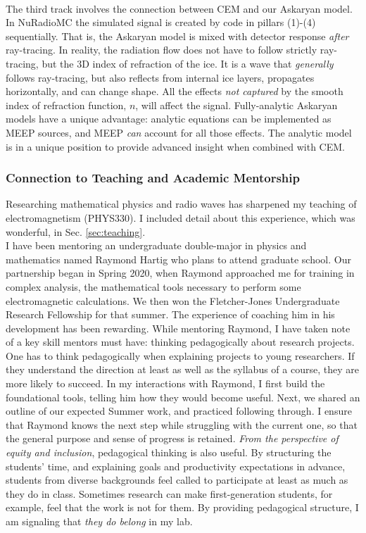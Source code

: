 \documentclass[../../../main.tex]{subfiles}
\begin{document}
\\
\vspace{0.15cm}
The third track involves the connection between CEM and our Askaryan model.  In NuRadioMC the simulated signal is created by code in pillars (1)-(4) sequentially.  That is, the Askaryan model is mixed with detector response \textit{after} ray-tracing.  In reality, the radiation flow does not have to follow strictly ray-tracing, but the 3D index of refraction of the ice.  It is a wave that \textit{generally} follows ray-tracing, but also reflects from internal ice layers, propagates horizontally, and can change shape.  All the effects \textit{not captured} by the smooth index of refraction function, $n$, will affect the signal.  Fully-analytic Askaryan models have a unique advantage: analytic equations can be implemented as MEEP sources, and MEEP \textit{can} account for all those effects.  The analytic model is in a unique position to provide advanced insight when combined with CEM.

\subsubsection{Connection to Teaching and Academic Mentorship}

Researching mathematical physics and radio waves has sharpened my teaching of electromagnetism (PHYS330).  I included detail about this experience, which was wonderful, in Sec. \ref{sec:teaching}.
\\
\vspace{0.15cm}
I have been mentoring an undergraduate double-major in physics and mathematics named Raymond Hartig who plans to attend graduate school.  Our partnership began in Spring 2020, when Raymond approached me for training in complex analysis, the mathematical tools necessary to perform some electromagnetic calculations.  We then won the Fletcher-Jones Undergraduate Research Fellowship for that summer.  The experience of coaching him in his development has been rewarding.  While mentoring Raymond, I have taken note of a key skill mentors must have: thinking pedagogically about research projects.
\\
\vspace{0.15cm}
One has to think pedagogically when explaining projects to young researchers.  If they understand the direction at least as well as the syllabus of a course, they are more likely to succeed.  In my interactions with Raymond, I first build the foundational tools, telling him how they would become useful.  Next, we shared an outline of our expected Summer work, and practiced following through.  I ensure that Raymond knows the next step while struggling with the current one, so that the general purpose and sense of progress is retained.  \textit{From the perspective of equity and inclusion}, pedagogical thinking is also useful.  By structuring the students' time, and explaining goals and productivity expectations in advance, students from diverse backgrounds feel called to participate at least as much as they do in class.  Sometimes research can make first-generation students, for example, feel that the work is not for them.  By providing pedagogical structure, I am signaling that \textit{they do belong} in my lab.
\end{document}
